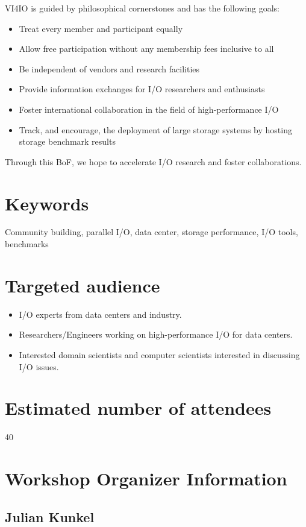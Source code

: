 \documentclass[a4paper,10pt]{article}
\begin{document}
VI4IO is guided by philosophical cornerstones and has the following goals:
\begin{itemize}
  \item Treat every member and participant equally
  \item Allow free participation without any membership fees inclusive to all
  \item Be independent of vendors and research facilities
  \item Provide information exchanges for I/O researchers and enthusiasts 
  \item Foster international collaboration in the field of high-performance I/O
  \item Track, and encourage, the deployment of large storage systems by hosting storage benchmark results 
\end{itemize}

Through this BoF, we hope to accelerate I/O research and foster collaborations.

\section{Keywords} 
Community building, parallel I/O, data center, storage performance, I/O tools, benchmarks


\section{Targeted audience}
\begin{itemize}
  \item I/O experts from data centers and industry.
  \item Researchers/Engineers working on high-performance I/O for data centers.
  \item Interested domain scientists and computer scientists interested in discussing I/O issues.
\end{itemize}


\section{Estimated number of attendees}
40

\section{Workshop Organizer Information}

\subsection{Julian Kunkel}
\end{document}
